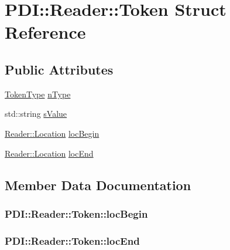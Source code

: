 \hypertarget{struct_p_d_i_1_1_reader_1_1_token}{
\section{PDI::Reader::Token Struct Reference}
\label{struct_p_d_i_1_1_reader_1_1_token}
}
\subsection*{Public Attributes}
\begin{CompactItemize}
\item 
\hyperlink{class_p_d_i_1_1_reader_1763e50e90708afa61cd3b69979772e9}{TokenType} \hyperlink{struct_p_d_i_1_1_reader_1_1_token_b40312c21bb6b1efbe14eadf7429506a}{nType}
\item 
std::string \hyperlink{struct_p_d_i_1_1_reader_1_1_token_d64a746e8931b0c31539435df202f1f1}{sValue}
\item 
\hyperlink{struct_p_d_i_1_1_reader_1_1_location}{Reader::Location} \hyperlink{struct_p_d_i_1_1_reader_1_1_token_a431c7cf2519645fa10290fd5cfaed0c}{locBegin}
\item 
\hyperlink{struct_p_d_i_1_1_reader_1_1_location}{Reader::Location} \hyperlink{struct_p_d_i_1_1_reader_1_1_token_d30f85fe6c23b2546236b13866ea1287}{locEnd}
\end{CompactItemize}


\subsection{Member Data Documentation}
\hypertarget{struct_p_d_i_1_1_reader_1_1_token_a431c7cf2519645fa10290fd5cfaed0c}{
\subsubsection[{locBegin}]{ {\bf PDI::Reader::Token::locBegin}}}
\label{struct_p_d_i_1_1_reader_1_1_token_a431c7cf2519645fa10290fd5cfaed0c}


\hypertarget{struct_p_d_i_1_1_reader_1_1_token_d30f85fe6c23b2546236b13866ea1287}{
\subsubsection[{locEnd}]{ {\bf PDI::Reader::Token::locEnd}}}
\label{struct_p_d_i_1_1_reader_1_1_token_d30f85fe6c23b2546236b13866ea1287}


